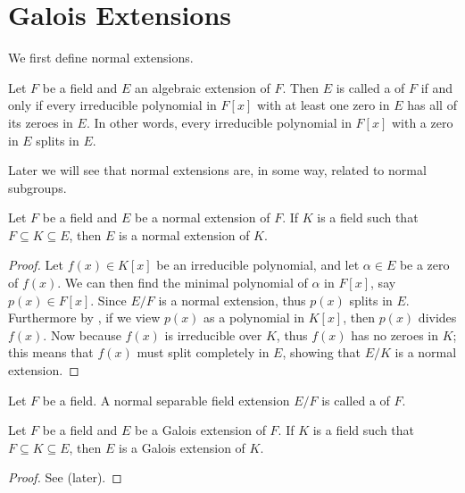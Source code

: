 \section{Galois Extensions}
We first define normal extensions.

\begin{definition}
    Let $F$ be a field and $E$ an algebraic extension of $F$. Then $E$ is called a  of $F$ if and only if every irreducible polynomial in $F[x]$ with at least one zero in $E$ has all of its zeroes in $E$. In other words, every irreducible polynomial in $F[x]$ with a zero in $E$ splits in $E$.
\end{definition}

Later we will see that normal extensions are, in some way, related to normal subgroups.

\begin{proposition}\label{prop-intermediate-field-of-normal-extension-is-normal-extension}
    Let $F$ be a field and $E$ be a normal extension of $F$. If $K$ is a field such that $F \subseteq K \subseteq E$, then $E$ is a normal extension of $K$.
\end{proposition}
\begin{proof}
    Let $f(x) \in K[x]$ be an irreducible polynomial, and let $\alpha \in E$ be a zero of $f(x)$. We can then find the minimal polynomial of $\alpha$ in $F[x]$, say $p(x) \in F[x]$. Since $E/F$ is a normal extension, thus $p(x)$ splits in $E$. Furthermore by , if we view $p(x)$ as a polynomial in $K[x]$, then $p(x)$ divides $f(x)$. Now because $f(x)$ is irreducible over $K$, thus $f(x)$ has no zeroes in $K$; this means that $f(x)$ must split completely in $E$, showing that $E/K$ is a normal extension.
\end{proof}

\begin{definition}
    Let $F$ be a field. A normal separable field extension $E/F$ is called a  of $F$.
\end{definition}

\begin{proposition}\label{prop-intermediate-field-of-galois-extension-is-galois-extension}
    Let $F$ be a field and $E$ be a Galois extension of $F$. If $K$ is a field such that $F \subseteq K \subseteq E$, then $E$ is a Galois extension of $K$.
\end{proposition}
\begin{proof}
    See  (later).
\end{proof}

